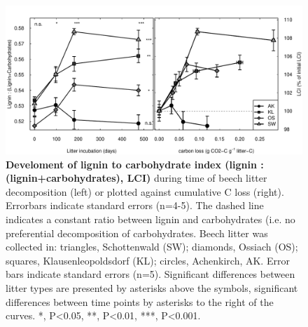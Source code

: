 \documentclass[10pt]{article}
\begin{document}
\begin{flushleft}
\newpage
\begin{figure}[!ht]
\begin{center}
\includegraphics{ligpaper-lci}
\end{center}
\caption{
{\bf Develoment of lignin to carbohydrate index (lignin : (lignin+carbohydrates), LCI)} during time of beech litter decomposition (left) or plotted against cumulative C loss (right). Errorbars indicate standard errors (n=4-5). The dashed line indicates a constant ratio between lignin and carbohydrates (i.e. no preferential decomposition of carbohydrates. Beech litter was collected in: triangles, Schottenwald (SW); diamonds, Ossiach (OS); squares, Klausenleopoldsdorf (KL); circles, Achenkirch, AK. Error bars indicate standard errors (n=5). Significant differences between litter types are presented by asterisks above the symbols, significant differences between time points by asterisks to the right of the curves. *, P\textless 0.05, **, P\textless 0.01, ***, P\textless 0.001.}
\label{fig:lci}
\end{figure}



\end{flushleft}
\end{document}
